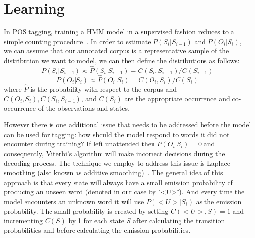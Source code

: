 \section{Learning}
\label{sec:learning}
In POS tagging, training a HMM model in a supervised fashion reduces to a simple counting procedure~\cite{nlpBook}. In order to estimate $P( S_i | S_{i-1} )$ and $P( O_i | S_i )$, we can assume that our annotated corpus is a representative sample of the distribution we want to model, we can then define the distributions as follows:
\vspace{-1em}
\begin{equation}
P( S_i | S_{i-1} ) \approx \hat{P}( S_i | S_{i-1} ) = C( S_i, S_{i-1} )/C( S_{i-1} )
\end{equation}
\vspace{-1em}
\begin{equation}
P( O_i | S_i ) \approx \hat{P}( O_i | S_i ) = C( O_i, S_i )/C( S_i )
\end{equation}
where $\hat{P}$ is the probability with respect to the corpus and $C( O_i, S_i ), C( S_i, S_{i-1} )$, and $C( S_i )$ are the appropriate occurrence and co-occurrence of the observations and states.

However there is one additional issue that needs to be addressed before the model can be used for tagging: how should the model respond to words it did not encounter during training? If left unattended then $P( O_i | S_i ) = 0$ and consequently, Viterbi's algorithm will make incorrect decisions during the decoding process. The technique we employ to address this issue is Laplace smoothing (also known as additive smoothing)~\cite{laplaceSmooth}. The general idea of this approach is that every state will always have a small emission probability of producing an unseen word (denoted in our case by "<U>"). And every time the model encounters an unknown word it will use $P( <U> | S_i )$ as the emission probability. The small probability is created by setting $C( <U>, S ) = 1$ and incrementing $C( S )$ by 1 for each state $S$ after calculating the transition probabilities and before calculating the emission probabilities.

